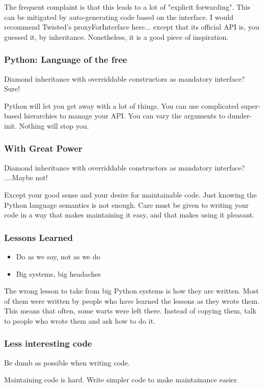 \documentclass[ignorenonframetext,aspectration=169]{beamer}
\begin{document}
The frequent complaint is that this leads to a lot of
"explicit forwarding".
This can be mitigated by auto-generating code based on the interface.
I would recommend Twisted's proxyForInterface here...
except that its official API is,
you guessed it,
by inheritance.
Nonetheless,
it is a good piece of inspiration.

\begin{frame}[fragile]
\frametitle{Python: Language of the free}

Diamond inheritance with overriddable constructors as mandatory interface?
Sure!
\end{frame}

Python will let you get away with a lot of things.
You can use complicated super-based hierarchies to manage
your API.
You can vary the arguments to dunder-init.
Nothing will stop you.

\begin{frame}[fragile]
\frametitle{With Great Power}

Diamond inheritance with overriddable constructors as mandatory interface?
....Maybe not!
\end{frame}

Except your good sense and your desire for maintainable code.
Just knowing the Python language semantics is not enough.
Care must be given to writing your code in a way that makes maintaining
it easy,
and that makes using it pleasant.

\begin{frame}[fragile]
\frametitle{Lessons Learned}

\begin{itemize}
\item Do as we say, not as we do
\item Big systems, big headaches
\end{itemize}

\end{frame}

The wrong lesson to take from big Python systems is how they are written.
Most of them were written by people who have learned the lessons
as they wrote them.
This means that often,
some warts were left there.
Instead of copying them,
talk to people who wrote them and ask how to do it.

\begin{frame}[fragile]
\frametitle{Less interesting code}

Be dumb as possible when writing code.

\end{frame}

Maintaining code is hard.
Write simpler code to make maintainance easier.
\end{document}
